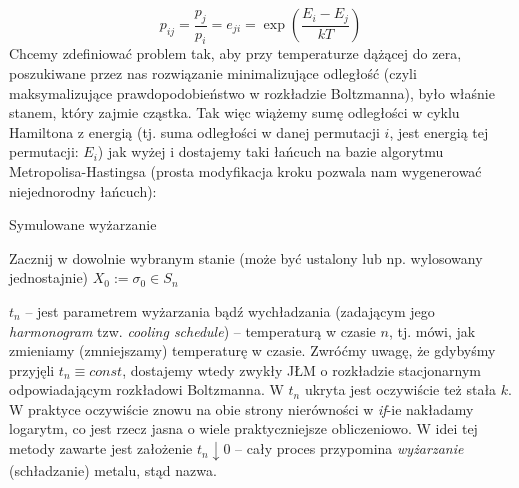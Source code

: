 \documentclass[a4paper]{article}
\theoremstyle{defn}
\theoremstyle{theorem}
\theoremstyle{lemma}
\theoremstyle{cor}
\theoremstyle{fact}
\begin{document}
$$p_{ij} = \frac{p_j}{p_i} = e_{ji} = \exp\left(\frac{E_i - E_j}{kT}\right)$$
Chcemy zdefiniować problem tak, aby przy temperaturze dążącej do zera, poszukiwane przez nas rozwiązanie minimalizujące odległość (czyli maksymalizujące prawdopodobieństwo w rozkładzie Boltzmanna), było właśnie stanem, który zajmie cząstka. Tak więc wiążemy sumę odległości w cyklu Hamiltona z energią (tj. suma odległości w danej permutacji $i$, jest energią tej permutacji: $E_i$) jak wyżej i dostajemy taki łańcuch na bazie algorytmu Metropolisa-Hastingsa (prosta modyfikacja kroku pozwala nam wygenerować niejednorodny łańcuch):\\
\begin{algorithm}[H]
\caption{Symulowane wyżarzanie}
Zacznij w dowolnie wybranym stanie (może być ustalony lub np. wylosowany jednostajnie) $X_0 := \sigma_0 \in S_n$\\
\end{algorithm}
$t_n$ – jest parametrem wyżarzania bądź wychładzania (zadającym jego \textit{harmonogram} tzw. \textit{cooling schedule}) – temperaturą w czasie $n$, tj. mówi, jak zmieniamy (zmniejszamy) temperaturę w czasie. Zwróćmy uwagę, że gdybyśmy przyjęli $t_n \equiv const$, dostajemy wtedy zwykły JŁM o rozkładzie stacjonarnym odpowiadającym rozkładowi Boltzmanna. W $t_n$ ukryta jest oczywiście też stała $k$. \\
W praktyce oczywiście znowu na obie strony nierówności w \textit{if}-ie nakładamy logarytm, co jest rzecz jasna o wiele praktyczniejsze obliczeniowo.
W idei tej metody zawarte jest założenie $t_n \downarrow 0$ – cały proces przypomina \textit{wyżarzanie} (schładzanie) metalu, stąd nazwa.
\end{document}
